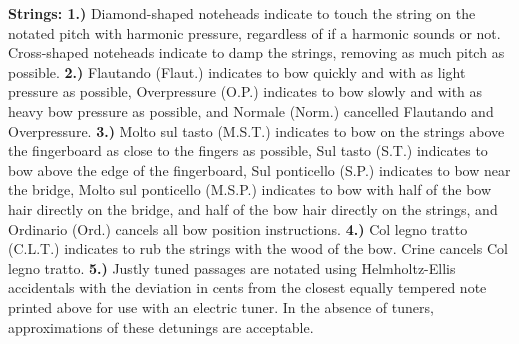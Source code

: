 \documentclass[11pt]{article}
\begin{document}
\begingroup
\begin{center}
\textbf{Strings: 1.)} Diamond-shaped noteheads indicate to touch the string on the notated pitch with harmonic pressure, regardless of if a harmonic sounds or not. Cross-shaped noteheads indicate to damp the strings, removing as much pitch as possible. \textbf{2.)} Flautando (Flaut.) indicates to bow quickly and with as light pressure as possible, Overpressure (O.P.) indicates to bow slowly and with as heavy bow pressure as possible, and Normale (Norm.) cancelled Flautando and Overpressure. \textbf{3.)} Molto sul tasto (M.S.T.) indicates to bow on the strings above the fingerboard as close to the fingers as possible, Sul tasto (S.T.) indicates to bow above the edge of the fingerboard, Sul ponticello (S.P.) indicates to bow near the bridge, Molto sul ponticello (M.S.P.) indicates to bow with half of the bow hair directly on the bridge, and half of the bow hair directly on the strings, and Ordinario (Ord.) cancels all bow position instructions. \textbf{4.)} Col legno tratto (C.L.T.) indicates to rub the strings with the wood of the bow. Crine cancels Col legno tratto. \textbf{5.)} Justly tuned passages are notated using Helmholtz-Ellis accidentals with the deviation in cents from the closest equally tempered note printed above for use with an electric tuner. In the absence of tuners, approximations of these detunings are acceptable. \\
\rightskip\leftskip
\end{center}
\endgroup
\end{document}
